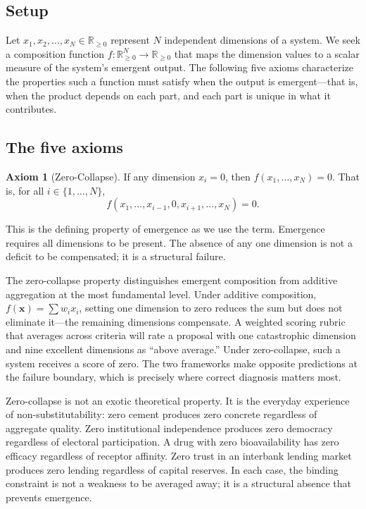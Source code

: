 \documentclass[12pt, a4paper]{article}
\theoremstyle{definition}
\newtheorem{axiom}{Axiom}
\theoremstyle{remark}
\newcommand{\Rnn}{\mathbb{R}_{\geq 0}}
\begin{document}
\subsection{Setup}

Let $x_1, x_2, \ldots, x_N \in \Rnn$ represent $N$ independent dimensions of a system. We seek a composition function $f: \Rnn^N \to \Rnn$ that maps the dimension values to a scalar measure of the system's emergent output. The following five axioms characterize the properties such a function must satisfy when the output is emergent---that is, when the product depends on each part, and each part is unique in what it contributes.

\subsection{The five axioms}

\begin{axiom}[Zero-Collapse]\label{ax:zero}
If any dimension $x_i = 0$, then $f(x_1, \ldots, x_N) = 0$. That is, for all $i \in \{1, \ldots, N\}$,
\[
f(x_1, \ldots, x_{i-1}, 0, x_{i+1}, \ldots, x_N) = 0.
\]
\end{axiom}

\noindent This is the defining property of emergence as we use the term. Emergence requires all dimensions to be present. The absence of any one dimension is not a deficit to be compensated; it is a structural failure.

The zero-collapse property distinguishes emergent composition from additive aggregation at the most fundamental level. Under additive composition, $f(\mathbf{x}) = \sum w_i x_i$, setting one dimension to zero reduces the sum but does not eliminate it---the remaining dimensions compensate. A weighted scoring rubric that averages across criteria will rate a proposal with one catastrophic dimension and nine excellent dimensions as ``above average.'' Under zero-collapse, such a system receives a score of zero. The two frameworks make opposite predictions at the failure boundary, which is precisely where correct diagnosis matters most.

Zero-collapse is not an exotic theoretical property. It is the everyday experience of non-substitutability: zero cement produces zero concrete regardless of aggregate quality. Zero institutional independence produces zero democracy regardless of electoral participation. A drug with zero bioavailability has zero efficacy regardless of receptor affinity. Zero trust in an interbank lending market produces zero lending regardless of capital reserves. In each case, the binding constraint is not a weakness to be averaged away; it is a structural absence that prevents emergence.
\end{document}
